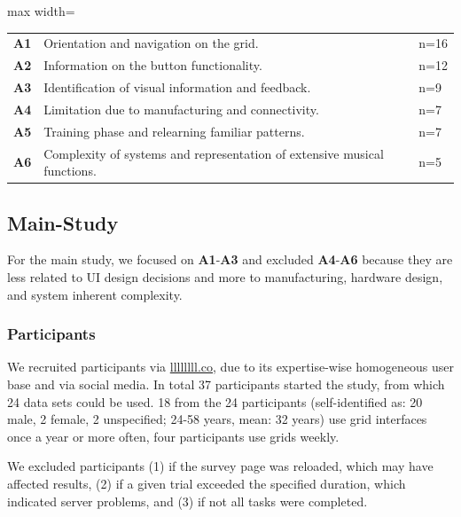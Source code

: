 \documentclass[sigconf]{nimeart}
\begin{document}
\begin{table}[htbp]\centering\small
\begin{adjustbox}{max width=\textwidth}\begin{tabular}{@{}lll@{}}

\toprule
\midrule

\textbf{A1} & Orientation and navigation on the grid. & n=16 \\
\textbf{A2} & Information on the button functionality. & n=12 \\
\textbf{A3} & Identification of visual information and feedback. & n=9 \\
\textbf{A4} & Limitation due to manufacturing and connectivity. & n=7 \\
\textbf{A5} & Training phase and relearning familiar patterns. & n=7 \\
\textbf{A6} & Complexity of systems and representation of extensive musical functions. & n=5 \\
\bottomrule
\end{tabular}\end{adjustbox}\end{table}

\subsection{Main-Study}\label{main-study}

For the main study, we focused on \textbf{A1}-\textbf{A3} and excluded \textbf{A4}-\textbf{A6} because they are less related to UI design decisions and more to manufacturing, hardware design, and system inherent complexity.

\subsubsection{Participants}\label{participants}

We recruited participants via \href{https://llllllll.co}{llllllll.co}, due to its expertise-wise homogeneous user base and via social media. In total 37 participants started the study, from which 24 data sets could be used. 18 from the 24 participants (self-identified as: 20 male, 2 female, 2 unspecified; 24-58 years, mean: 32 years) use grid interfaces once a year or more often, four participants use grids weekly.

We excluded participants (1) if the survey page was reloaded, which may have affected results, (2) if a given trial exceeded the specified duration, which indicated server problems, and (3) if not all tasks were completed.
\end{document}
